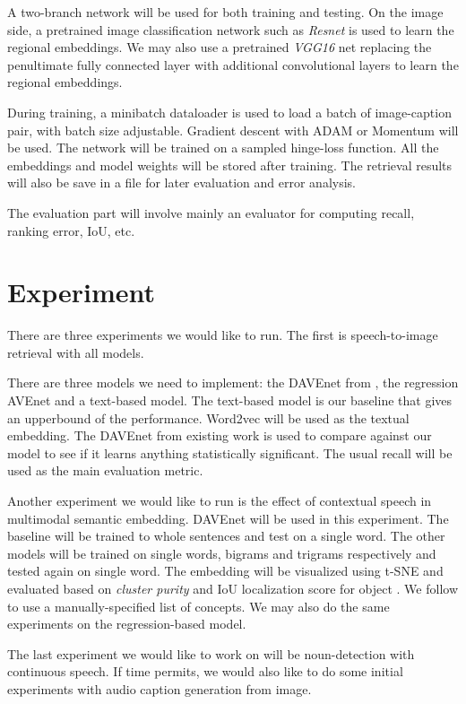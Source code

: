 \documentclass[a4paper]{article}
\begin{document}
A two-branch network will be used for both
training and testing. On the image side, a 
pretrained image classification network such as \textit{Resnet} is used to learn
the regional embeddings. We may also use a pretrained \textit{VGG16} net replacing the
penultimate fully connected layer with
additional convolutional layers to learn
the regional embeddings. 

During training, a minibatch dataloader is used
to load a batch of image-caption pair, with 
batch size adjustable. Gradient descent with
ADAM or Momentum will be used. The network will
be trained on a sampled hinge-loss function.
All the embeddings and model weights will be stored after training. The retrieval results
will also be save in a file for later 
evaluation and error analysis.

The evaluation part will involve mainly an
evaluator for computing recall, ranking error, IoU, etc. 

\section{Experiment}
There are three experiments we would like to run. The first is speech-to-image retrieval with all models. 

There are three models we need to implement:
the DAVEnet from \cite{Harwarth18}, the regression AVEnet and a text-based model. The
text-based model is our baseline that gives an
upperbound of the performance. Word2vec
will be used as the textual embedding. The DAVEnet from existing work is used to compare
against our model to see if it learns anything
statistically significant. The usual recall 
will be used as the main evaluation metric.

Another experiment we would like to run is the
effect of contextual speech in multimodal semantic embedding. DAVEnet will be used in
this experiment. The baseline will be trained to whole sentences and test on a single
word. The other models will be trained on single words, bigrams and trigrams respectively and tested again on single word. The embedding will
be visualized using t-SNE and evaluated based
on \textit{cluster purity} and IoU localization score for object . We
follow \cite{Harwath18} to use a manually-specified list of concepts. We may 
also do the same experiments on the
regression-based model.

The last experiment we would like to work on
will be noun-detection with continuous speech.
If time permits, we would also like to do some
initial experiments with audio caption generation from image.
\end{document}
